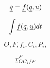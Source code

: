 





\[
\vecd{\dot{q}} = \vecd{f} (\vecd{q}, \vecd{u})
\]

\[
  \int  \vecd{f} (\vecd{q}, \vecd{u}) dt
\]


\[
  O, F, f_{i}, C_{i}, P_{i},
 \]

\[
  \pvec{r}{OC_{i}}{F}{F}
\]








